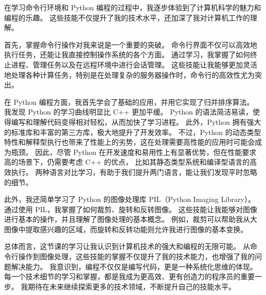在学习命令行环境和 Python 编程的过程中，我逐步体验到了计算机科学的魅力和编程的乐趣。
这些技能不仅提升了我的技术水平，还加深了我对计算机工作的理解。

首先，掌握命令行操作对我来说是一个重要的突破。
命令行界面不仅可以高效地执行任务，还能让我直接控制操作系统的各个方面。
通过学习，我掌握了如何终止进程、管理任务以及在远程环境中进行会话管理。
这些技能让我能够更加灵活地处理各种计算任务，特别是在处理复杂的服务器操作时，命令行的高效性尤为突出。

在 Python 编程方面，我首先学会了基础的应用，并用它实现了归并排序算法。
我发现 Python 的学习曲线明显比 C++ 更加平缓。
Python 的语法简洁易读，使得编写和理解代码变得相对轻松，从而加快了学习进程。
此外，Python 拥有强大的标准库和丰富的第三方库，极大地提升了开发效率。
不过，Python 的动态类型特性和解释型执行也带来了性能上的劣势，这在处理需要高性能的应用时可能会成为瓶颈。
因此，尽管 Python 在开发速度和易用性上有显著优势，但在性能要求高的场景下，仍需要考虑 C++ 的优点，
比如其静态类型系统和编译型语言的高效执行。
两种语言对比学习，有助于我们提升两门语言，能让我们发现平时忽略的细节。

此外，我还简单学习了 Python 的图像处理库 PIL（Python Imaging Library）。
通过使用 PIL，我掌握了如何裁剪、旋转和反转图像。
这些技能让我能够对图像进行基本的操作，并且理解了图像处理的基本概念。
例如，裁剪可以帮助我从大图像中提取感兴趣的区域，而旋转和反转功能则允许我进行图像的基本变换。

总体而言，这节课的学习让我认识到计算机技术的强大和编程的无限可能。
从命令行操作到图像处理，这些技能的掌握不仅提升了我的技术能力，也增强了我的问题解决能力。
我意识到，编程不仅仅是编写代码，更是一种系统化思维的体现。
每一个技术细节的学习和掌握，都是我成为更高效、更有创造力的程序员的重要一步。
我期待在未来继续探索更多的技术领域，不断提升自己的技能水平。